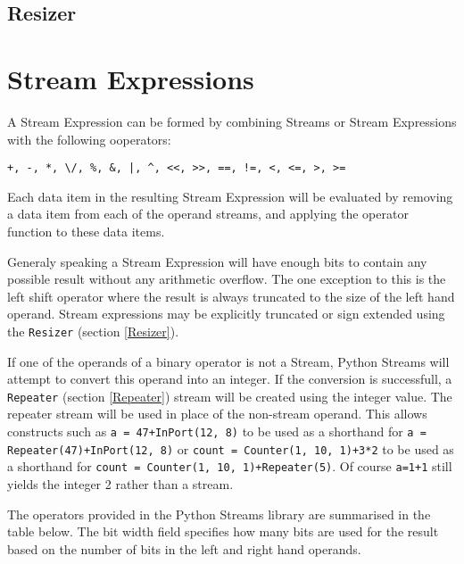\subsection{Resizer}

\section{Stream Expressions}

A Stream Expression can be formed by combining Streams or Stream Expressions
with the following ooperators: 
\begin{verbatim}
+, -, *, \/, %, &, |, ^, <<, >>, ==, !=, <, <=, >, >=
\end{verbatim}
Each data item in the resulting Stream Expression will be evaluated by removing
a data item from each of the operand streams, and applying the operator function
to these data items.

Generaly speaking a Stream Expression will have enough bits to contain any
possible result without any arithmetic overflow. The one exception to this is
the left shift operator where the result is always truncated to the size of the
left hand operand. Stream expressions may be explicitly truncated or sign
extended using the \verb|Resizer| (section \ref{Resizer}).

If one of the operands of a binary operator is not a Stream, Python Streams
will attempt to convert this operand into an integer. If the conversion is
successfull, a \verb|Repeater| (section \ref{Repeater}) stream will be created
using the integer value. The repeater stream will be used in place of the
non-stream operand. This allows constructs such as \verb|a = 47+InPort(12, 8)|
to be used as a shorthand for \verb|a = Repeater(47)+InPort(12, 8)| or
\verb|count = Counter(1, 10, 1)+3*2| to be used as a shorthand for
\verb|count = Counter(1, 10, 1)+Repeater(5)|.
Of course \verb|a=1+1| still yields the integer 2 rather than a stream.

The operators provided in the Python Streams library are summarised in the table
below. The bit width field specifies how many bits are used for the result
based on the number of bits in the left and right hand operands.

